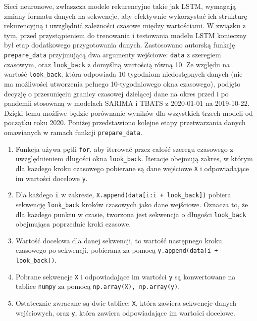 \documentclass[polish, twoside, 12pt, a4paper]{article}
\theoremstyle{definition}
\theoremstyle{plain}
\theoremstyle{remark}
\newcommand{\code}[1]{\lstinline{#1}}
\begin{document}
Sieci neuronowe, zwłaszcza modele rekurencyjne takie jak LSTM, wymagają zmiany formatu danych na sekwencje, aby efektywnie wykorzystać ich strukturę rekurencyjną i uwzględnić zależności czasowe między wartościami. W związku z tym, przed przystąpieniem do trenowania i testowania modelu LSTM konieczny był etap dodatkowego przygotowania danych. Zastosowano autorską funkcję \code{prepare_data} przyjmującą dwa argumenty wejściowe: \code{data} z szeregiem czasowym, oraz \code{look_back} z domyślną wartością równą 10. Ze względu na wartość \code{look_back}, która odpowiada 10 tygodniom niedostępnych danych (nie ma możliwości utworzenia pełnego 10-tygodniowego okna czasowego), podjęto decyzję o przesunięciu granicy czasowej dzielącej dane na okres przed i po pandemii stosowaną w modelach SARIMA i TBATS z 2020-01-01 na 2019-10-22. Dzięki temu możliwe będzie porównanie wyników dla wszystkich trzech modeli od początku roku 2020. Poniżej przedstawiono kolejne etapy przetwarzania danych omawianych w ramach funkcji \code{prepare_data}.
\begin{enumerate}[label=\arabic*.,noitemsep]
	\item Funkcja używa pętli \code{for}, aby iterować przez całość szeregu czasowego z uwzględnieniem długości okna \code{look_back}. Iteracje obejmują zakres, w którym dla każdego kroku czasowego pobierane są dane wejściowe \code{X} i odpowiadające im wartości docelowe \code{y}.
	\item Dla każdego \code{i} w zakresie, \code{X.append(data[i:i + look_back])} pobiera sekwencję \code{look_back} kroków czasowych jako dane wejściowe. Oznacza to, że dla każdego punktu w czasie, tworzona jest sekwencja o długości \code{look_back} obejmująca poprzednie kroki czasowe.
	\item Wartość docelowa dla danej sekwencji, to wartość następnego kroku czasowego po sekwencji, pobierana za pomocą \code{y.append(data[i + look_back])}.
	\item Pobrane sekwencje \code{X} i odpowiadające im wartości \code{y} są konwertowane na tablice \code{numpy} za pomocą \code{np.array(X), np.array(y)}.
	\item Ostatecznie zwracane są dwie tablice: \code{X}, która zawiera sekwencje danych wejściowych, oraz \code{y}, która zawiera odpowiadające im wartości docelowe.
\end{enumerate}
\end{document}
